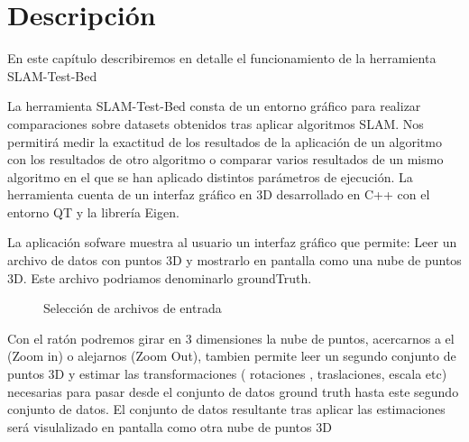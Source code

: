 \newpage
\chapter{Descripción} \label{cap:Descripcion}

En este capítulo describiremos en detalle el funcionamiento de la herramienta SLAM-Test-Bed

La herramienta SLAM-Test-Bed consta de un entorno gráfico para realizar comparaciones sobre datasets obtenidos tras aplicar algoritmos SLAM. 
Nos permitirá medir la exactitud de los resultados de la aplicación de un algoritmo con los resultados de otro algoritmo o comparar varios resultados de un mismo algoritmo en el que se han aplicado distintos parámetros de ejecución.
La herramienta cuenta de un interfaz gráfico en 3D desarrollado en C++ con el entorno QT y la librería Eigen.


La aplicación sofware muestra al usuario un interfaz gráfico que permite:
Leer un archivo de datos con puntos 3D y mostrarlo en pantalla como una nube de puntos 3D. Este archivo podriamos denominarlo groundTruth.
\begin{figure}[H]
\begin{center}
\hspace{0.5cm}
\end{center}
\caption{Selección de archivos de entrada }
\end{figure}

Con el ratón podremos girar en 3 dimensiones la nube de puntos, acercarnos a el (Zoom in) o alejarnos (Zoom Out),
tambien permite leer un segundo conjunto de puntos 3D y estimar las transformaciones ( rotaciones , traslaciones, escala etc)  necesarias para pasar desde el conjunto de datos ground truth hasta este segundo conjunto de datos. El conjunto de datos resultante tras aplicar las estimaciones será visulalizado en pantalla como otra nube de puntos 3D

